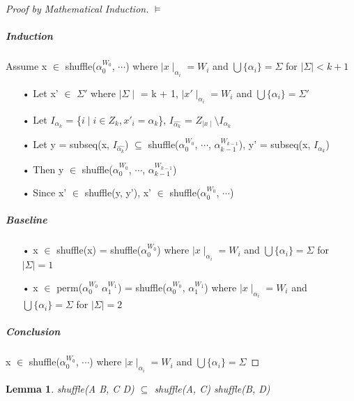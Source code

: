 \documentclass[12pt]{article}
\newtheorem{lemma}{Lemma}
\begin{document}
\begin{proof}[Proof by Mathematical Induction]$\vDash$

\subparagraph{Induction}
Assume x $\in$ shuffle($\alpha_{0}^{W_{0}}$, $\cdots$) where $\mid x \mid_{\alpha_{i}}=W_{i}$ and $\bigcup\{ \alpha_{i} \} = \Sigma$ for $\mid \Sigma \mid < k + 1$

\begin{itemize}
\item[•]Let x' $\in$ $\Sigma'$ where $\mid \Sigma \mid$ = k + 1, $\mid x' \mid_{\alpha_{i}}=W_{i}$ and $\bigcup\{ \alpha_{i} \} = \Sigma'$
\item[•]Let $I_{\alpha_{k}}$ = \{$ i \mid i \in Z_{k}, x'_{i} = \alpha_{k} $\}, $I_{\hat{\alpha_{k}}}$ = $Z_{\mid x \mid} \setminus I_{\alpha_{k}}$
\item[•]Let y = subseq(x, $I_{\hat{\alpha_{k}}}$) $\subseteq$ shuffle($\alpha_{0}^{W_{0}}$, $\cdots$, $\alpha_{k - 1}^{W_{k - 1}}$), y' = subseq(x, $I_{\alpha_{k}}$)
\item[•]Then y $\in$ shuffle($\alpha_{0}^{W_{0}}$, $\cdots$, $\alpha_{k - 1}^{W_{k - 1}}$)
\item[•]Since x' $\in$ shuffle(y, y'), x' $\in$ shuffle($\alpha_{0}^{W_{0}}$, $\cdots$)
\end{itemize}

\subparagraph{Baseline}
\begin{itemize}
\item[•]x $\in$ shuffle(x) = shuffle($\alpha_{0}^{W_{0}}$) where $\mid x \mid_{\alpha_{i}}=W_{i}$ and $\bigcup\{ \alpha_{i} \} = \Sigma$ for $\mid \Sigma \mid = 1$
\item[•]x $\in$ perm($\alpha_{0}^{W_{0}}$ $\alpha_{1}^{W_{1}}$) = shuffle($\alpha_{0}^{W_{0}}$, $\alpha_{1}^{W_{1}}$) where $\mid x \mid_{\alpha_{i}}=W_{i}$ and $\bigcup\{ \alpha_{i} \} = \Sigma$ for $\mid \Sigma \mid = 2$
\end{itemize}

\subparagraph{Conclusion}
x $\in$ shuffle($\alpha_{0}^{W_{0}}$, $\cdots$) where $\mid x \mid_{\alpha_{i}}=W_{i}$ and $\bigcup\{ \alpha_{i} \} = \Sigma$
\end{proof}

\begin{lemma}
shuffle(A B, C D) $\subseteq$ shuffle(A, C) shuffle(B, D)
\end{lemma}
\end{document}
